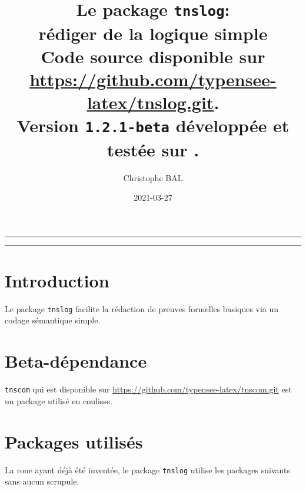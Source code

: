 \documentclass[12pt,a4paper]{article}
\theoremstyle{definition}
\begin{document}
\renewcommand\labelitemi{\raisebox{0.125em}{\tiny\textbullet}}
\renewcommand{\labelitemii}{---}

\title{  %
	Le package \texttt{tnslog}:\\%
	rédiger de la logique simple\\%
	{\footnotesize Code source disponible sur \url{https://github.com/typensee-latex/tnslog.git}.}\\%
{\footnotesize Version \texttt{1.2.1-beta} développée et testée sur \macosxname{}.}%
}
\author{Christophe BAL}
\date{2021-03-27}

\maketitle


\vspace{2em}

\hrule

\tableofcontents

\vspace{1.5em}

\hrule

\newpage

\section{Introduction}

Le package \verb+tnslog+ facilite la rédaction de preuves formelles basiques via un codage sémantique simple.


\section{Beta-dépendance}

\verb#tnscom# qui est disponible sur \url{https://github.com/typensee-latex/tnscom.git} est un package utilisé en coulisse.
\section{Packages utilisés}

La roue ayant déjà été inventée, le package \verb#tnslog# utilise les packages suivants sans aucun scrupule.
\end{document}
